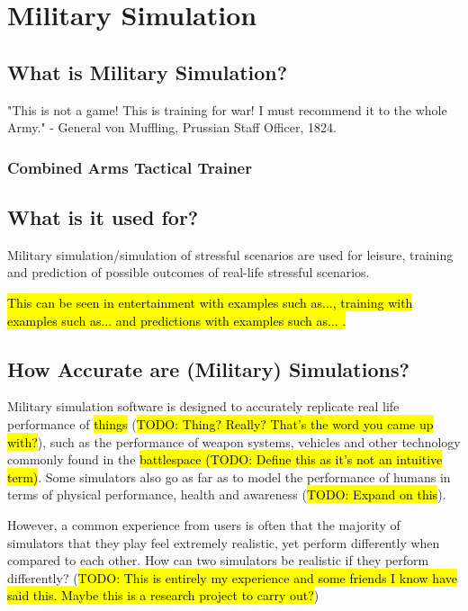\documentclass{article}
\begin{document}
\section{Military Simulation}

\subsection{What is Military Simulation?}

"This is not a game! This is training for war! I must recommend it to the whole Army." - General von Muffling, Prussian Staff Officer, 1824.

\subsubsection{Combined Arms Tactical Trainer}




\subsection{What is it used for?}

Military simulation/simulation of stressful scenarios are used for leisure, training and prediction of possible outcomes of real-life stressful scenarios.

\hl{This can be seen in entertainment with examples such as..., training with examples such as... and predictions with examples such as... .}

\subsection{How Accurate are (Military) Simulations?}

Military simulation software is designed to accurately replicate real life performance of \hl{things} (\hl{TODO: Thing? Really? That's the word you came up with?}), such as the performance of weapon systems, vehicles and other technology commonly found in the \hl{battlespace (TODO: Define this as it's not an intuitive term)}. Some simulators also go as far as to model the performance of humans in terms of physical performance, health and awareness (\hl{TODO: Expand on this}).

However, a common experience from users is often that the majority of simulators that they play feel extremely realistic, yet perform differently when compared to each other. How can two simulators be realistic if they perform differently? (\hl{TODO: This is entirely my experience and some friends I know have said this. Maybe this is a research project to carry out?})
\end{document}
